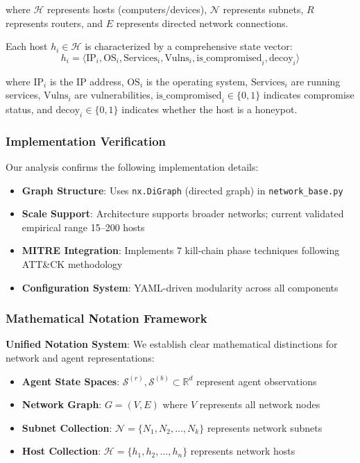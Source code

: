 \documentclass[12pt,oneside,a4paper]{article}
\newcounter{phase}[algorithm]
\theoremstyle{definition}
\theoremstyle{plain}
\begin{document}
where $\mathcal{H}$ represents hosts (computers/devices), $\mathcal{N}$ represents subnets, $R$ represents routers, and $E$ represents directed network connections.

Each host $h_i \in \mathcal{H}$ is characterized by a comprehensive state vector:
\begin{equation}
h_i = \langle \text{IP}_i, \text{OS}_i, \text{Services}_i, \text{Vulns}_i, \text{is\_compromised}_i, \text{decoy}_i \rangle
\end{equation}

where $\text{IP}_i$ is the IP address, $\text{OS}_i$ is the operating system, $\text{Services}_i$ are running services, $\text{Vulns}_i$ are vulnerabilities, $\text{is\_compromised}_i \in \{0,1\}$ indicates compromise status, and $\text{decoy}_i \in \{0,1\}$ indicates whether the host is a honeypot.

\subsubsection{Implementation Verification}
Our analysis confirms the following implementation details:
\begin{itemize}
    \item \textbf{Graph Structure}: Uses \texttt{nx.DiGraph} (directed graph) in \texttt{network\_base.py}
    \item \textbf{Scale Support}: Architecture supports broader networks; current validated empirical range 15--200 hosts
    \item \textbf{MITRE Integration}: Implements 7 kill-chain phase techniques following ATT\&CK methodology
    \item \textbf{Configuration System}: YAML-driven modularity across all components
\end{itemize}

\subsubsection{Mathematical Notation Framework}

\textbf{Unified Notation System}: We establish clear mathematical distinctions for network and agent representations:

\begin{itemize}
\item \textbf{Agent State Spaces}: $\mathcal{S}^{(r)}, \mathcal{S}^{(b)} \subset \mathbb{R}^{d}$ represent agent observations
\item \textbf{Network Graph}: $G = (V, E)$ where $V$ represents all network nodes  
\item \textbf{Subnet Collection}: $\mathcal{N} = \{N_1, N_2, \ldots, N_k\}$ represents network subnets
\item \textbf{Host Collection}: $\mathcal{H} = \{h_1, h_2, \ldots, h_n\}$ represents network hosts
\end{itemize}
\end{document}
